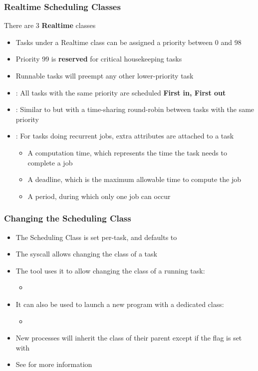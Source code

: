 \begin{frame}
	\frametitle{Realtime Scheduling Classes}
	There are 3 \textbf{Realtime} classes
	\begin{itemize}
		\item Tasks under a Realtime class can be assigned a priority between 0 and 98
		\item Priority 99 is \textbf{reserved} for critical housekeeping tasks
		\item Runnable tasks will preempt any other lower-priority task
		\item {}: All tasks with the same priority are scheduled \textbf{First in, First out}
		\item {}: Similar to  but with a time-sharing round-robin between tasks with the same priority
		\item {}: For tasks doing recurrent jobs, extra attributes are attached to a task
			\begin{itemize}
				\item A computation time, which represents the time the task needs to complete a job
				\item A deadline, which is the maximum allowable time to compute the job
				\item A period, during which only one job can occur
			\end{itemize}
	\end{itemize}
\end{frame}

\begin{frame}
	\frametitle{Changing the Scheduling Class}
	\begin{itemize}
		\item The Scheduling Class is set per-task, and defaults to 
		\item The  syscall allows changing the class of a task
		\item The  tool uses it to allow changing the class of a running task:
			\begin{itemize}
				\item {}
			\end{itemize}
		\item It can also be used to launch a new program with a dedicated class:
			\begin{itemize}
				\item {}
			\end{itemize}
		\item New processes will inherit the class of their parent except if the  flag is set with 
		\item See  for more information
	\end{itemize}
\end{frame}
